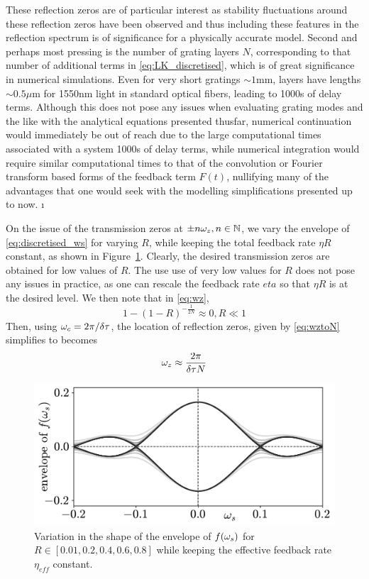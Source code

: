 These reflection zeros are of particular interest as stability fluctuations around these reflection zeros have been observed and thus including these features in the reflection spectrum is of significance for a physically accurate model. 
Second and perhaps most pressing is the number of grating layers $N$, corresponding to that number of additional terms in \eqref{eq:LK_discretised}, which is of great significance in numerical simulations. 
Even for very short gratings $\sim 1\text{mm}$, layers have lengths $\sim 0.5\mu\text{m}$ for 1550nm light in standard optical fibers, leading to 1000s of delay terms. 
Although this does not pose any issues when evaluating grating modes and the like with the analytical equations presented thusfar, 
numerical continuation would immediately be out of reach due to the large computational times associated with a system 1000s of delay terms, 
while numerical integration would require similar computational times to that of the convolution or Fourier transform based forms of the feedback term $F(t)$, 
nullifying many of the advantages that one would seek with the modelling simplifications presented up to now. 
ı%
\par
%
On the issue of the transmission zeros at $\pm n \omega_z, n \in \mathbb{N}$, we vary the envelope of \eqref{eq:discretised_ws} for varying $R$, 
while keeping the total feedback rate $\eta R$ constant, as shown in Figure~\ref{fig:discretised_EGM_envelope_variations}. 
Clearly, the desired transmission zeros are obtained for low values of $R$. 
The use use of very low values for $R$ does not pose any issues in practice, as one can rescale the feedback rate $eta$ so that $\eta R$ is at the desired level. 
We then note that in \eqref{eq:wz},
%
\begin{equation*}
    1-(1-R)^{-\frac{1}{2N}} \approx 0, R\ll1
\end{equation*}
%
Then, using $\omega_c = 2\pi/\delta \tau$, the location of reflection zeros, given by \eqref{eq:wztoN} simplifies to becomes
%
\begin{equation}
    \label{eq:wz_approx}
    \omega_z \approx \frac{2\pi}{\delta \tau N}
\end{equation}
%
\begin{figure}
    \centering 
    
    \includegraphics[width=\linewidth]{Images/discretised_EGM_envelope_variations.pdf}   
    
    \caption{Variation in the shape of the envelope of $f(\omega_s)$ for $R \in [0.01, 0.2, 0.4, 0.6, 0.8]$ while keeping the effective feedback rate $\eta_{eff}$ constant.}
    
    \label{fig:discretised_EGM_envelope_variations}
\end{figure}
